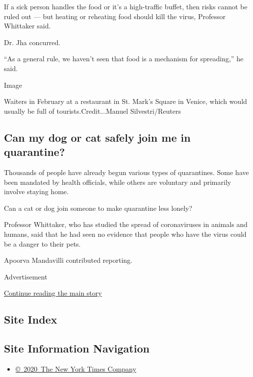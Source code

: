 If a sick person handles the food or it's a high-traffic buffet, then
risks cannot be ruled out --- but heating or reheating food should kill
the virus, Professor Whittaker said.

Dr. Jha concurred.

``As a general rule, we haven't seen that food is a mechanism for
spreading,'' he said.

Image

Waiters in February at a restaurant in St. Mark's Square in Venice,
which would usually be full of tourists.Credit...Manuel
Silvestri/Reuters

\hypertarget{can-my-dog-or-cat-safely-join-me-in-quarantine}{%
\subsection{Can my dog or cat safely join me in
quarantine?}\label{can-my-dog-or-cat-safely-join-me-in-quarantine}}

Thousands of people have already begun various types of quarantines.
Some have been mandated by health officials, while others are voluntary
and primarily involve staying home.

Can a cat or dog join someone to make quarantine less lonely?

Professor Whittaker, who has studied the spread of coronaviruses in
animals and humans, said that he had seen no evidence that people who
have the virus could be a danger to their pets.

Apoorva Mandavilli contributed reporting.

Advertisement

\protect\hyperlink{after-bottom}{Continue reading the main story}

\hypertarget{site-index}{%
\subsection{Site Index}\label{site-index}}

\hypertarget{site-information-navigation}{%
\subsection{Site Information
Navigation}\label{site-information-navigation}}

\begin{itemize}
\tightlist
\item
  \href{https://help.nytimes3xbfgragh.onion/hc/en-us/articles/115014792127-Copyright-notice}{©~2020~The
  New York Times Company}
\end{itemize}

